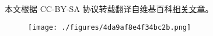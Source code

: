
本文根据 CC-BY-SA 协议转载翻译自维基百科\href{https://en.wikipedia.org/wiki/Nikola_Tesla}{相关文章}。


\begin{figure}[ht]
\centering
\texttt{[image: ./figures/4da9af8e4f34bc2b.png]}
\caption{} \label{fig_Tesla_1}
\end{figure}